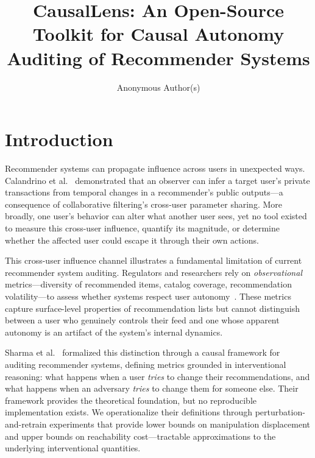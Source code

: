 \documentclass[sigconf,anonymous]{acmart}
\title{CausalLens: An Open-Source Toolkit for Causal Autonomy Auditing of Recommender Systems}
\author{Anonymous Author(s)}
\affiliation{%
  \institution{Anonymous Institution}
}
\begin{document}
\maketitle

\section{Introduction}
\label{sec:intro}

Recommender systems can propagate influence across users in unexpected ways. Calandrino et al.~\cite{calandrino2011you} demonstrated that an observer can infer a target user's private transactions from temporal changes in a recommender's public outputs---a consequence of collaborative filtering's cross-user parameter sharing. More broadly, one user's behavior can alter what another user sees, yet no tool existed to measure this cross-user influence, quantify its magnitude, or determine whether the affected user could escape it through their own actions.

This cross-user influence channel illustrates a fundamental limitation of current recommender system auditing. Regulators and researchers rely on \emph{observational} metrics---diversity of recommended items, catalog coverage, recommendation volatility---to assess whether systems respect user autonomy~\cite{eu_dsa2022, ge2010beyond, zhang2008avoiding}. These metrics capture surface-level properties of recommendation lists but cannot distinguish between a user who genuinely controls their feed and one whose apparent autonomy is an artifact of the system's internal dynamics.

Sharma et al.~\cite{sharma2024unified} formalized this distinction through a causal framework for auditing recommender systems, defining metrics grounded in interventional reasoning: what happens when a user \emph{tries} to change their recommendations, and what happens when an adversary \emph{tries} to change them for someone else. Their framework provides the theoretical foundation, but no reproducible implementation exists. We operationalize their definitions through perturbation-and-retrain experiments that provide lower bounds on manipulation displacement and upper bounds on reachability cost---tractable approximations to the underlying interventional quantities.
\end{document}
